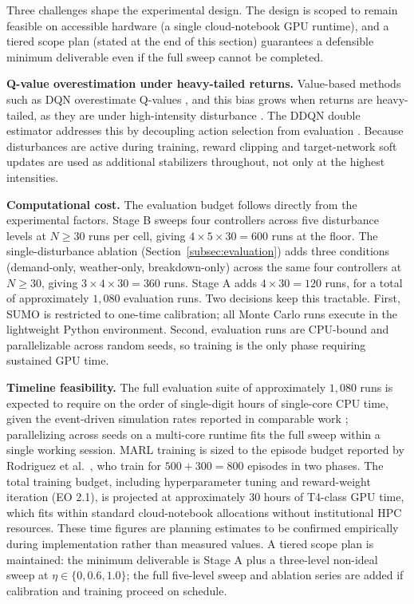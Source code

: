 Three challenges shape the experimental design. The design is scoped to remain feasible on accessible hardware (a single cloud-notebook GPU runtime), and a tiered scope plan (stated at the end of this section) guarantees a defensible minimum deliverable even if the full sweep cannot be completed.

\textbf{Q-value overestimation under heavy-tailed returns.} Value-based methods such as DQN overestimate Q-values \cite{vanHasselt2016DDQN}, and this bias grows when returns are heavy-tailed, as they are under high-intensity disturbance \cite{Henderson2018Matters,Agarwal2021Precipice}. The DDQN double estimator addresses this by decoupling action selection from evaluation \cite{vanHasselt2016DDQN}. Because disturbances are active during training, reward clipping and target-network soft updates are used as additional stabilizers throughout, not only at the highest intensities.

\textbf{Computational cost.} The evaluation budget follows directly from the experimental factors. Stage B sweeps four controllers across five disturbance levels at $N \geq 30$ runs per cell, giving $4 \times 5 \times 30 = 600$ runs at the floor. The single-disturbance ablation (Section~\ref{subsec:evaluation}) adds three conditions (demand-only, weather-only, breakdown-only) across the same four controllers at $N \geq 30$, giving $3 \times 4 \times 30 = 360$ runs. Stage A adds $4 \times 30 = 120$ runs, for a total of approximately $1{,}080$ evaluation runs. Two decisions keep this tractable. First, SUMO is restricted to one-time calibration; all Monte Carlo runs execute in the lightweight Python environment. Second, evaluation runs are CPU-bound and parallelizable across random seeds, so training is the only phase requiring sustained GPU time.

\textbf{Timeline feasibility.} The full evaluation suite of approximately $1{,}080$ runs is expected to require on the order of single-digit hours of single-core CPU time, given the event-driven simulation rates reported in comparable work \cite{Wangsun,Rodriguez2023Cooperative}; parallelizing across seeds on a multi-core runtime fits the full sweep within a single working session. MARL training is sized to the episode budget reported by Rodriguez et al.~\cite{Rodriguez2023Cooperative}, who train for $500 + 300 = 800$ episodes in two phases. The total training budget, including hyperparameter tuning and reward-weight iteration (EO 2.1), is projected at approximately 30 hours of T4-class GPU time, which fits within standard cloud-notebook allocations without institutional HPC resources. These time figures are planning estimates to be confirmed empirically during implementation rather than measured values. A tiered scope plan is maintained: the minimum deliverable is Stage A plus a three-level non-ideal sweep at $\eta \in \{0, 0.6, 1.0\}$; the full five-level sweep and ablation series are added if calibration and training proceed on schedule.